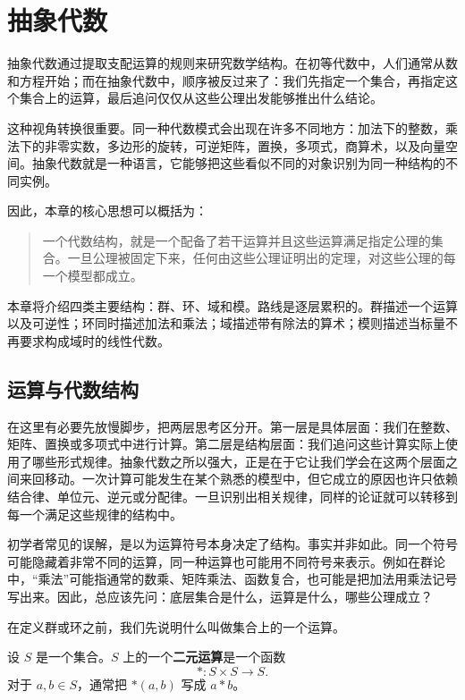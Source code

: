 \chapter{抽象代数}

抽象代数通过提取支配运算的规则来研究数学结构。在初等代数中，人们通常从数和方程开始；而在抽象代数中，顺序被反过来了：我们先指定一个集合，再指定这个集合上的运算，最后追问仅仅从这些公理出发能够推出什么结论。

这种视角转换很重要。同一种代数模式会出现在许多不同地方：加法下的整数，乘法下的非零实数，多边形的旋转，可逆矩阵，置换，多项式，商算术，以及向量空间。抽象代数就是一种语言，它能够把这些看似不同的对象识别为同一种结构的不同实例。

因此，本章的核心思想可以概括为：

\begin{quote}
    一个代数结构，就是一个配备了若干运算并且这些运算满足指定公理的集合。一旦公理被固定下来，任何由这些公理证明出的定理，对这些公理的每一个模型都成立。
\end{quote}

本章将介绍四类主要结构：群、环、域和模。路线是逐层累积的。群描述一个运算以及可逆性；环同时描述加法和乘法；域描述带有除法的算术；模则描述当标量不再要求构成域时的线性代数。

\section{运算与代数结构}


在这里有必要先放慢脚步，把两层思考区分开。第一层是具体层面：我们在整数、矩阵、置换或多项式中进行计算。第二层是结构层面：我们追问这些计算实际上使用了哪些形式规律。抽象代数之所以强大，正是在于它让我们学会在这两个层面之间来回移动。一次计算可能发生在某个熟悉的模型中，但它成立的原因也许只依赖结合律、单位元、逆元或分配律。一旦识别出相关规律，同样的论证就可以转移到每一个满足这些规律的结构中。

初学者常见的误解，是以为运算符号本身决定了结构。事实并非如此。同一个符号可能隐藏着非常不同的运算，同一种运算也可能用不同符号来表示。例如在群论中，“乘法”可能指通常的数乘、矩阵乘法、函数复合，也可能是把加法用乘法记号写出来。因此，总应该先问：底层集合是什么，运算是什么，哪些公理成立？

在定义群或环之前，我们先说明什么叫做集合上的一个运算。

\begin{definition}[二元运算]
设 $S$ 是一个集合。$S$ 上的一个\textbf{二元运算}是一个函数
\[
    *:S\times S\to S.
\]
对于 $a,b\in S$，通常把 $*(a,b)$ 写成 $a*b$。
\end{definition}

